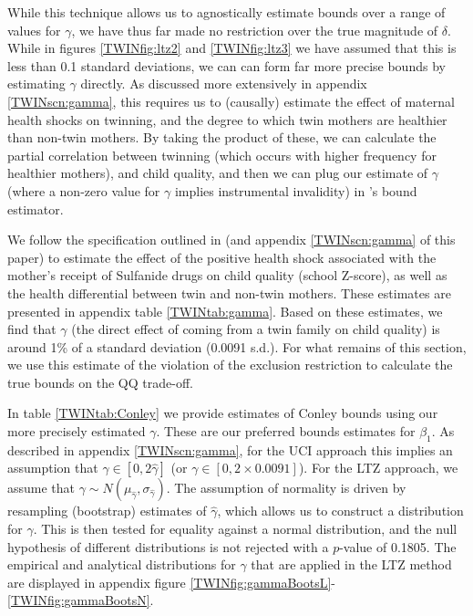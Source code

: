 While this technique allows us to agnostically estimate bounds over a range 
of values for $\gamma$, we have thus far made no restriction over the true 
magnitude of $\delta$.  While in figures \ref{TWINfig:ltz2} and 
\ref{TWINfig:ltz3} we have assumed that this is less than 0.1 standard 
deviations, we can can form far more precise bounds by estimating $\gamma$ 
directly.  As discussed more extensively in appendix \ref{TWINscn:gamma}, this 
requires us to (causally) estimate the effect of maternal health shocks on 
twinning, and the degree to which twin mothers are healthier than non-twin
mothers.  By taking the product of these, we can calculate the partial 
correlation between twinning (which occurs with higher frequency for healthier 
mothers), and child quality, and then we can plug our estimate of $\gamma$ 
(where a non-zero value for $\gamma$ implies instrumental invalidity) in 
\citeauthor{Conleyetal2012}'s bound estimator.

We follow the specification outlined in \citet{BhalotraVenkataramani2014}
(and appendix \ref{TWINscn:gamma} of this paper) to estimate the effect of 
the positive health shock associated with the mother's receipt of Sulfanide 
drugs on child quality (school Z-score), as well as the health differential
between twin and non-twin mothers.  These estimates are presented in appendix 
table \ref{TWINtab:gamma}.  Based on these estimates, we find that $\gamma$
(the direct effect of coming from a twin family on child quality) is around
1\% of a standard deviation (0.0091 s.d.).  For what remains of this section, 
we use this estimate of the violation of the exclusion restriction to 
calculate the true bounds on the QQ trade-off.

In table \ref{TWINtab:Conley} we provide estimates of Conley bounds using 
our more precisely estimated $\gamma$.  These are our preferred bounds 
estimates for $\beta_1$.  As described in appendix \ref{TWINscn:gamma}, for 
the UCI approach this implies an assumption that $\gamma \in [0,2\hat\gamma]$
(or $\gamma \in [0,2\times 0.0091]$).  For the LTZ approach, we assume that 
$\gamma\sim N(\mu_{\hat\gamma},\sigma_{\hat\gamma})$.  The assumption of 
normality is driven by resampling (bootstrap) estimates of $\hat\gamma$,
which allows us to construct a distribution for $\gamma$.  This is then
tested for equality against a normal distribution, and the null hypothesis
of different distributions is not rejected with a $p$-value of 0.1805.  The 
empirical and analytical distributions for $\gamma$ that are applied in the 
LTZ method are displayed in appendix figure \ref{TWINfig:gammaBootsL}-%
\ref{TWINfig:gammaBootsN}.

